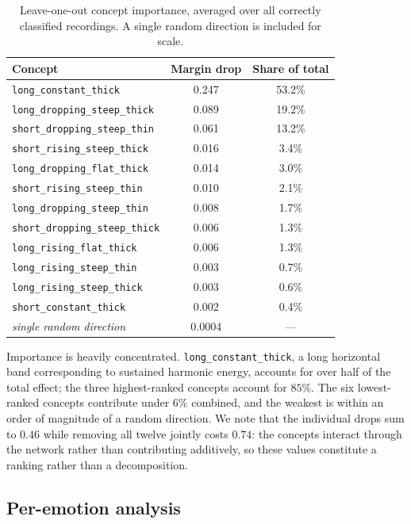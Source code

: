 \begin{table}[t]
\centering
\caption{Leave-one-out concept importance, averaged over all correctly
classified recordings. A single random direction is included for scale.}
\label{tab:concept-importance}
\begin{tabular}{lcc}
\toprule
Concept & Margin drop & Share of total \\
\midrule
\texttt{long\_constant\_thick}        & 0.247 & 53.2\% \\
\texttt{long\_dropping\_steep\_thick} & 0.089 & 19.2\% \\
\texttt{short\_dropping\_steep\_thin} & 0.061 & 13.2\% \\
\texttt{short\_rising\_steep\_thick}  & 0.016 & 3.4\% \\
\texttt{long\_dropping\_flat\_thick}  & 0.014 & 3.0\% \\
\texttt{short\_rising\_steep\_thin}   & 0.010 & 2.1\% \\
\texttt{long\_dropping\_steep\_thin}  & 0.008 & 1.7\% \\
\texttt{short\_dropping\_steep\_thick}& 0.006 & 1.3\% \\
\texttt{long\_rising\_flat\_thick}    & 0.006 & 1.3\% \\
\texttt{long\_rising\_steep\_thin}    & 0.003 & 0.7\% \\
\texttt{long\_rising\_steep\_thick}   & 0.003 & 0.6\% \\
\texttt{short\_constant\_thick}       & 0.002 & 0.4\% \\
\midrule
\emph{single random direction}        & 0.0004 & --- \\
\bottomrule
\end{tabular}
\end{table}

Importance is heavily concentrated. \texttt{long\_constant\_thick}, a long
horizontal band corresponding to sustained harmonic energy, accounts for over
half of the total effect; the three highest-ranked concepts account for $85\%$.
The six lowest-ranked concepts contribute under $6\%$ combined, and the weakest
is within an order of magnitude of a random direction. We note that the
individual drops sum to $0.46$ while removing all twelve jointly costs $0.74$:
the concepts interact through the network rather than contributing additively,
so these values constitute a ranking rather than a decomposition.

\subsection{Per-emotion analysis}
\label{sec:ablation-per-emotion}

